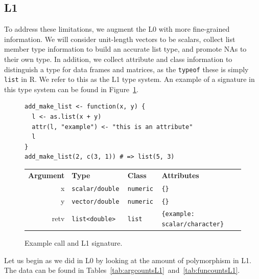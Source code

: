 \documentclass[acmsmall,10pt,review,anonymous]{acmart}\settopmatter{printfolios=true,printccs=false,printacmref=false}
\newcommand{\code}[1]{\lstinline|#1|\xspace}
\begin{document}

%
%
%
%
\subsection{L1}

To address these limitations, we augment the L0 with more fine-grained information.
We will consider unit-length vectors to be scalars, collect list member type information to build an accurate list type, and promote NAs to their own type. 
In addition, we collect attribute and class information to distinguish a type for data frames and matrices, as the \code{typeof} these is simply {\tt list} in R. 
We refer to this as the L1 type system. 
An example of a signature in this type system can be found in Figure~\ref{fig:exL1}.

\begin{figure}[!hb]{\small\begin{lstlisting}[style=R]
add_make_list <- function(x, y) {
  l <- as.list(x + y)
  attr(l, "example") <- "this is an attribute"
  l
}
add_make_list(2, c(3, 1)) # => list(5, 3)
\end{lstlisting}}

\begin{tabular}{@{}r|l|l|l@{}}\hline
\bf Argument & \bf Type & \bf Class &\bf Attributes \\
x & \tt scalar/double & \tt numeric & \tt \{\} \\
y & \tt vector/double & \tt numeric & \tt \{\} \\
retv & \tt list<double> & \tt list & \tt \{example: scalar/character\}  
\end{tabular}
\caption{Example call and L1 signature.}\label{fig:exL1}\end{figure}

Let us begin as we did in L0 by looking at the amount of polymorphism in L1.
The data can be found in Tables~\ref{tab:argcountsL1}~and~\ref{tab:funcountsL1}.
\end{document}
